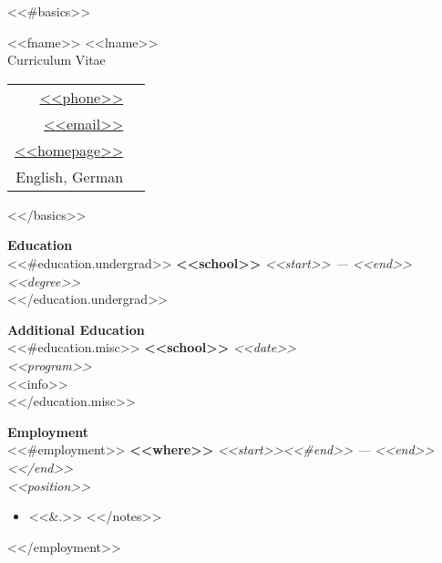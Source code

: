 \documentclass[11pt,a4paper,sans]{article}
\newcommand{\cvcolor}[1]{{\color{MidnightBlue}#1}}
\renewcommand{\section}[1]{
  \cvcolor{\noindent \textbf{\LARGE #1}}
  \vspace{.5em}\\
}
\renewcommand{\subsection}[1]{
  \cvcolor{\noindent \textbf{\Large #1} \dotfill}
  \vspace{.5em}\\
}
\begin{document}
<<#basics>>
\noindent
\begin{minipage}{0.6\linewidth}
 {
 \fontsize{40pt}{50pt}\selectfont
 \noindent
 {<<fname>> <<lname>>}}\\
{\LARGE \color{darkgray} {Curriculum Vitae}}
\end{minipage}
\hfill
\begin{tabular}{|rl}
  \href{tel:<<phone>>}{<<phone>>}&\cvcolor{\faPhone} \\
  \href{mailto:<<email>>}{<<email>>}&\cvcolor{\faEnvelope} \\
  \href{<<homepage>>}{<<homepage>>}&\cvcolor{\faGlobe} \\
  English, German & \cvcolor{\faLanguage} \\
\end{tabular}
<</basics>>

\vspace{1em}

\section{Education}
<<#education.undergrad>>
\textbf{<<school>>} \hfill \textsl{<<start>> --- <<end>>}\\
\textsl{<<degree>>}\\
<</education.undergrad>>

\subsection{Additional Education}
<<#education.misc>>
\textbf{<<school>>} \hfill \textsl{<<date>>}\\
\textsl{<<program>>}\\
<<info>>\\
<</education.misc>>

\section{Employment}
<<#employment>>
\textbf{<<where>>} \hfill \textsl{<<start>><<#end>> --- <<end>><</end>>}\\
\textsl{<<position>>}
\nopagebreak
\begin{itemize}
  <<#notes>>
  \item <<&.>>
  <</notes>>
\end{itemize}
\vspace{1em}
<</employment>>
\end{document}
